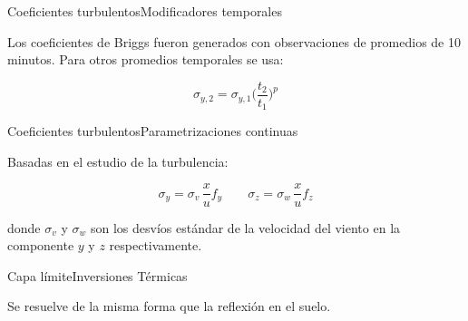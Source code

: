  \begin{frame}{Coeficientes turbulentos}{Modificadores temporales}
  
 Los coeficientes de Briggs fueron generados con observaciones de promedios de 10 minutos. Para otros promedios temporales se usa:
 
 $$ \sigma_{y,2}= \sigma_{y,1} \bigg( \dfrac{t_2}{t_1}\bigg)^p$$
 
 \end{frame}
  
 \begin{frame}{Coeficientes turbulentos}{Parametrizaciones continuas}
  
  Basadas en el estudio de la turbulencia:
  
 $$ \sigma_y = \sigma_v \, \dfrac{x}{u} f_y \qquad \sigma_z = \sigma_w \, \dfrac{x}{u} f_z$$
  
  donde $\sigma_v$ y $\sigma_w$ son los desvíos estándar de la velocidad del viento en la componente $y$ y $z$ respectivamente.
  
 \end{frame}
 
 \begin{frame}{Capa límite}{Inversiones Térmicas}
  
 \begin{center}
      
\end{center}

Se resuelve de la misma forma que la reflexión en el suelo.

\end{frame}
 
